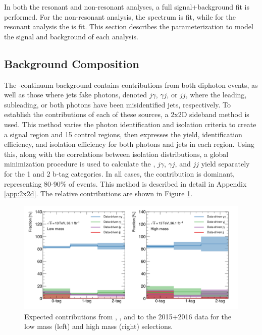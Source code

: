 In both the resonant and non-resonant analyses, a full signal+background fit is performed. For the non-resonant analysis, the \myy spectrum is fit, while for the resonant analysis the \myybb is fit. This section describes the parameterization to model the signal and background of each analysis.

\subsection{Background Composition} \label{ssec:background-composition}

The \yy-continuum background contains contributions from both diphoton events, as well as those where jets fake photons, denoted $j\gamma$, $\gamma j$, or $jj$, where the leading, subleading, or both photons have been misidentified jets, respectively. To establish the contributions of each of these sources, a 2x2D sideband method \cite{2x2d-sideband} is used. This method varies the photon identification and isolation criteria to create a signal region and 15 control regions, then expresses the yield, identification efficiency, and isolation efficiency for both photons and jets in each region. Using this, along with the correlations between isolation distributions, a global minimization procedure is used to calculate the \yy, $j\gamma$, $\gamma j$, and $jj$ yield separately for the 1 and 2 b-tag categories. In all cases, the \yy contribution is dominant, representing 80-90\% of events. This method is described in detail in Appendix \ref{app:2x2d}. The relative contributions are shown in Figure \ref{fig:background_fractions}.


\begin{figure}[!htb]
  \centering
  \includegraphics[width=\textwidth]{chapters/chapter5_yybb/images/2x2d/expected_contribution_clean.pdf}
  \caption[Expected contributions from \yy, \yj, \jy and \jj to the 2015+2016 data for the low and high mass selections]{Expected contributions from \yy, \yj, \jy and \jj to the 2015+2016 data for the low mass (left) and high mass (right) selections.
    \label{fig:background_fractions}}
\end{figure}


